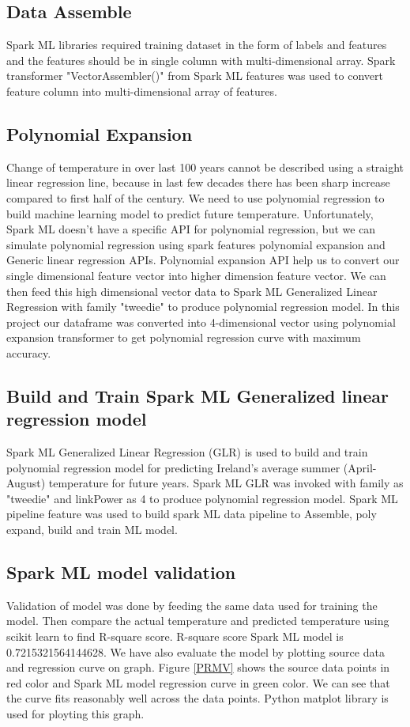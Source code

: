 \documentclass[journal,twoside,web]{ieeecolor}
\begin{document}
\subsection{Data Assemble}
Spark ML libraries required training dataset in the form of labels and features and the features should be in single column with multi-dimensional array.  Spark transformer "VectorAssembler()" from Spark ML features was used to convert feature column into multi-dimensional array of features. 

\subsection{Polynomial Expansion}
Change of temperature in over last 100 years cannot be described using a straight linear regression line, because in last few decades there has been sharp increase compared to first half of the century.  We need to use polynomial regression to build machine learning model to predict future temperature.  Unfortunately, Spark ML doesn't have a specific API for polynomial regression, but we can simulate polynomial regression using spark features polynomial expansion and Generic linear regression APIs.  Polynomial expansion API help us to convert our single dimensional feature vector into higher dimension feature vector. We can then feed this high dimensional vector data to Spark ML Generalized Linear Regression with family "tweedie" to produce polynomial regression model.  In this project our dataframe was converted into 4-dimensional vector using polynomial expansion transformer to get polynomial regression curve with maximum accuracy.

\subsection{Build and Train Spark ML Generalized linear regression model}
Spark ML Generalized Linear Regression (GLR) is used to build and train polynomial regression model for predicting Ireland's average summer (April-August) temperature for future years.  Spark ML GLR was invoked with family as "tweedie" and linkPower as 4 to produce polynomial regression model.  Spark ML pipeline feature was used to build spark ML data pipeline to Assemble, poly expand, build and train ML model.

\subsection{Spark ML model validation}
Validation of model was done by feeding the same data used for training the model.  Then compare the actual temperature and predicted temperature using scikit learn to find R-square score.  R-square score Spark ML model is 0.7215321564144628.  We have also evaluate the model by plotting source data and regression curve on graph. Figure \ref{PRMV} shows the source data points in red color and Spark ML model regression curve in green color. We can see that the curve fits reasonably well across the data points. Python matplot library is used for ployting this graph.
\end{document}
